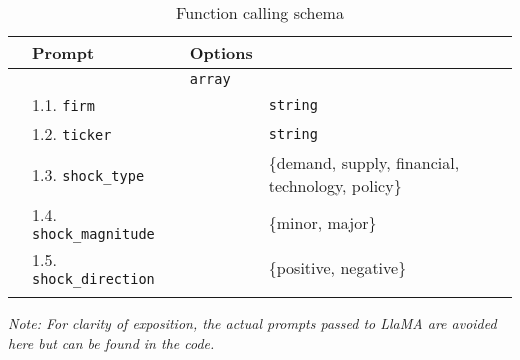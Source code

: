 \begin{table}[H]
\centering
\begin{threeparttable}
\caption{Function calling schema}
\begin{tabular}{lL{4.1cm}L{6.8cm}L{5cm}}
\hline \Xhline{2\arrayrulewidth}
 & \textbf{Prompt} & \textbf{Options} \tabularnewline
\hline \Xhline{2\arrayrulewidth} 
 &  & \texttt{array} \tabularnewline
\hline
 & 1.1. \texttt{firm} &  & \texttt{string}
 \tabularnewline
{}   
 & 1.2. \texttt{ticker} &  & \texttt{string}
 \tabularnewline
{}   
 & 1.3. \texttt{shock\_type} &  & \{demand, supply, financial, \newline technology, policy\}\tabularnewline
{}   
 & 1.4. \texttt{shock\_magnitude} &  & \{minor, major\}\tabularnewline
{}   
 & 1.5. \texttt{shock\_direction} &  & \{positive, negative\}\tabularnewline 
\hline \Xhline{2\arrayrulewidth}
\end{tabular}
\begin{tablenotes}
\footnotesize
\mx
\item \textit{Note: 
For clarity of exposition, the actual prompts passed to LlaMA are avoided here but can be found in the code. 
}
\end{tablenotes}
\label{tab:function_calling_structure}
\end{threeparttable}
\end{table}



